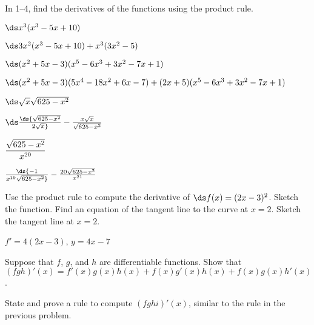 \begin{exercises}

In 1--4, find the derivatives of the functions using the product rule.

\begin{exercise} $\ds x^3(x^3-5x+10)$
\begin{answer} $\ds 3x^2(x^3-5x+10)+x^3(3x^2-5)$
\end{answer}\end{exercise}

\begin{exercise} $\ds (x^2+5x-3)(x^5-6x^3+3x^2-7x+1)$
\begin{answer} $\ds (x^2+5x-3)(5x^4-18x^2+6x-7)+(2x+5)(x^5-6x^3+3x^2-7x+1)$
\end{answer}\end{exercise}

\begin{exercise} $\ds \sqrt{x}\sqrt{625-x^2}$
\begin{answer} $\ds \ds{\sqrt{625-x^2}\over 2\sqrt{x}}-{x\sqrt{x}\over\sqrt{625-x^2}}$
\end{answer}\end{exercise}

\begin{exercise} $\displaystyle {\sqrt{625-x^2}\over x^{20}}$
\begin{answer} $\ds{-1\over x^{19}\sqrt{625-x^2}}-{20\sqrt{625-x^2}\over x^{21}}$
\end{answer}\end{exercise}

\begin{exercise} Use the product rule to compute the derivative of $\ds f(x)=(2x-3)^2$.
 Sketch the function.  Find an equation of the tangent line to the curve at
 $x=2$.  Sketch the tangent line at $x=2$.
\begin{answer} $f'=4(2x-3)$, $y=4x-7$
\end{answer}\end{exercise}

\begin{exercise}
Suppose that $f$, $g$, and $h$ are differentiable functions.
Show that $(fgh)'(x) = f'(x) g(x)h(x) + f(x)g'(x) h(x) + f(x) g(x)
h'(x)$.
\end{exercise}

\begin{exercise}
State and prove a rule to compute $(fghi)'(x)$, 
similar to the rule in the previous problem.
\end{exercise}


\end{exercises}
